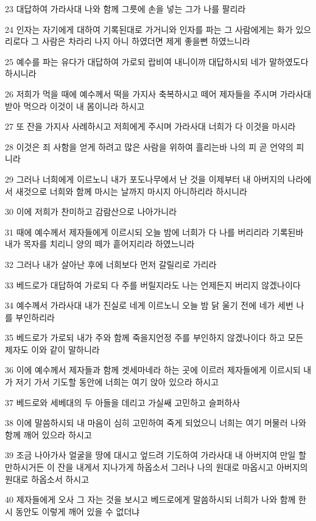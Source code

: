 \par 23 대답하여 가라사대 나와 함께 그릇에 손을 넣는 그가 나를 팔리라
\par 24 인자는 자기에게 대하여 기록된대로 가거니와 인자를 파는 그 사람에게는 화가 있으리로다 그 사람은 차라리 나지 아니 하였더면 제게 좋을뻔 하였느니라
\par 25 예수를 파는 유다가 대답하여 가로되 랍비여 내니이까 대답하시되 네가 말하였도다 하시니라
\par 26 저희가 먹을 때에 예수께서 떡을 가지사 축복하시고 떼어 제자들을 주시며 가라사대 받아 먹으라 이것이 내 몸이니라 하시고
\par 27 또 잔을 가지사 사례하시고 저희에게 주시며 가라사대 너희가 다 이것을 마시라
\par 28 이것은 죄 사함을 얻게 하려고 많은 사람을 위하여 흘리는바 나의 피 곧 언약의 피니라
\par 29 그러나 너희에게 이르노니 내가 포도나무에서 난 것을 이제부터 내 아버지의 나라에서 새것으로 너희와 함께 마시는 날까지 마시지 아니하리라 하시니라
\par 30 이에 저희가 찬미하고 감람산으로 나아가니라
\par 31 때에 예수께서 제자들에게 이르시되 오늘 밤에 너희가 다 나를 버리리라 기록된바 내가 목자를 치리니 양의 떼가 흩어지리라 하였느니라
\par 32 그러나 내가 살아난 후에 너희보다 먼저 갈릴리로 가리라
\par 33 베드로가 대답하여 가로되 다 주를 버릴지라도 나는 언제든지 버리지 않겠나이다
\par 34 예수께서 가라사대 내가 진실로 네게 이르노니 오늘 밤 닭 울기 전에 네가 세번 나를 부인하리라
\par 35 베드로가 가로되 내가 주와 함께 죽을지언정 주를 부인하지 않겠나이다 하고 모든 제자도 이와 같이 말하니라
\par 36 이에 예수께서 제자들과 함께 겟세마네라 하는 곳에 이르러 제자들에게 이르시되 내가 저기 가서 기도할 동안에 너희는 여기 앉아 있으라 하시고
\par 37 베드로와 세베대의 두 아들을 데리고 가실쌔 고민하고 슬퍼하사
\par 38 이에 말씀하시되 내 마음이 심히 고민하여 죽게 되었으니 너희는 여기 머물러 나와 함께 깨어 있으라 하시고
\par 39 조금 나아가사 얼굴을 땅에 대시고 엎드려 기도하여 가라사대 내 아버지여 만일 할만하시거든 이 잔을 내게서 지나가게 하옵소서 그러나 나의 원대로 마옵시고 아버지의 원대로 하옵소서 하시고
\par 40 제자들에게 오사 그 자는 것을 보시고 베드로에게 말씀하시되 너희가 나와 함께 한 시 동안도 이렇게 깨어 있을 수 없더냐
